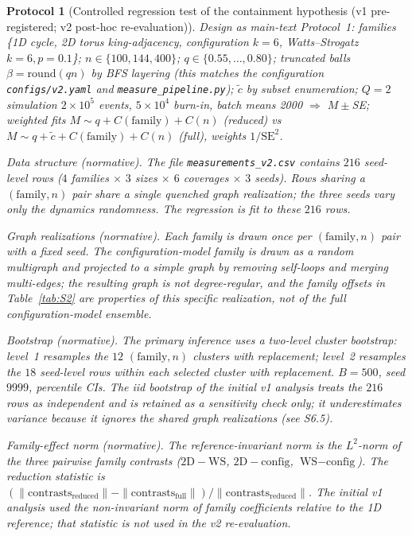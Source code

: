 \documentclass[preprint,12pt]{elsarticle}
\newtheorem{protocol}[theorem]{Protocol}
\newcommand{\ctil}{\tilde{c}}
\begin{document}
\begin{protocol}[Controlled regression test of the containment hypothesis
(v1 pre-registered; v2 post-hoc re-evaluation)]
\label{prot:F4}
Design as main-text Protocol~1: families \{1D cycle, 2D torus
king-adjacency, configuration $k=6$, Watts--Strogatz $k=6,p=0.1$\};
$n\in\{100,144,400\}$; $q\in\{0.55,\dots,0.80\}$;
truncated balls $\beta=\mathrm{round}(qn)$ by BFS layering
(this matches the configuration \texttt{configs/v2.yaml} and
\texttt{measure\_pipeline.py}); $\ctil$ by subset enumeration;
$Q=2$ simulation $2\times10^5$ events, $5\times10^4$ burn-in, batch
means 2000 $\Rightarrow$ $M\pm$SE; weighted fits
$M\sim q+C(\text{family})+C(n)$ (reduced) vs
$M\sim q+\ctil+C(\text{family})+C(n)$ (full), weights $1/\mathrm{SE}^2$.

\emph{Data structure (normative).} The file
\texttt{measurements\_v2.csv} contains \(216\) seed-level rows
(\(4\) families \(\times\) \(3\) sizes \(\times\) \(6\) coverages
\(\times\) \(3\) seeds). Rows sharing a \((\text{family},n)\) pair share
a single quenched graph realization; the three seeds vary only the
dynamics randomness. The regression is fit to these \(216\) rows.

\emph{Graph realizations (normative).} Each family is drawn once per
\((\text{family},n)\) pair with a fixed seed. The
configuration-model family is drawn as a random multigraph and projected
to a simple graph by removing self-loops and merging multi-edges; the
resulting graph is not degree-regular, and the family offsets in
Table~\ref{tab:S2} are properties of this specific realization, not of
the full configuration-model ensemble.

\emph{Bootstrap (normative).} The primary inference uses a two-level
cluster bootstrap: level~1 resamples the \(12\) \((\text{family},n)\)
clusters with replacement; level~2 resamples the \(18\) seed-level rows
within each selected cluster with replacement. \(B=500\), seed \(9999\),
percentile CIs. The iid bootstrap of the initial v1 analysis treats the
\(216\) rows as independent and is retained as a sensitivity check only;
it underestimates variance because it ignores the shared graph
realizations (see S6.5).

\emph{Family-effect norm (normative).} The reference-invariant norm is
the \(L^2\)-norm of the three pairwise family contrasts
(\(2\text{D}-\text{WS}\), \(2\text{D}-\text{config}\),
\(\text{WS}-\text{config}\)). The reduction statistic is
\((\|\text{contrasts}_{\text{reduced}}\|-\|\text{contrasts}_{\text{full}}\|)/\|\text{contrasts}_{\text{reduced}}\|\).
The initial v1 analysis used the non-invariant norm of family
coefficients relative to the 1D reference; that statistic is not used
in the v2 re-evaluation.


\end{protocol}
\end{document}
